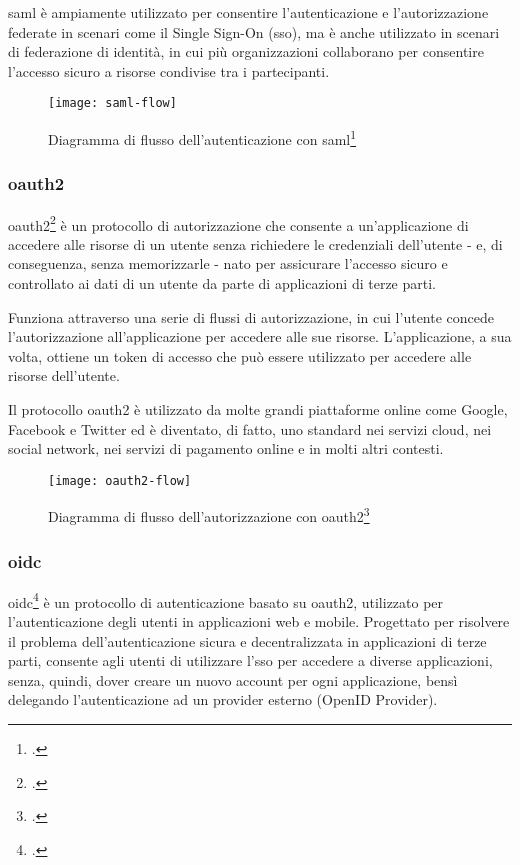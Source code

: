 \acrshort{saml} è ampiamente utilizzato per consentire l'autenticazione e l'autorizzazione federate in scenari come il Single Sign-On (\acrshort{sso}), ma è anche utilizzato in scenari di federazione di identità, in cui più organizzazioni collaborano per consentire l'accesso sicuro a risorse condivise tra i partecipanti.

\begin{figure}[!h] 
    \centering 
    \texttt{[image: saml-flow]} 
    \caption{Diagramma di flusso dell'autenticazione con \acrshort{saml}\footcite{site:saml-flow}}
\end{figure}

\subsubsection{\acrlong{oauth2}}
\acrshort{oauth2}\footcite{site:what-is-oauth} è un protocollo di autorizzazione che consente a un'applicazione di accedere alle risorse di un utente senza richiedere le credenziali dell'utente - e, di conseguenza, senza memorizzarle - nato per assicurare l'accesso sicuro e controllato ai dati di un utente da parte di applicazioni di terze parti.

Funziona attraverso una serie di flussi di autorizzazione, in cui l'utente concede l'autorizzazione all'applicazione per accedere alle sue risorse. L'applicazione, a sua volta, ottiene un token di accesso che può essere utilizzato per accedere alle risorse dell'utente.

Il protocollo \acrshort{oauth2} è utilizzato da molte grandi piattaforme online come Google, Facebook e Twitter ed è diventato, di fatto, uno standard nei servizi cloud, nei social network, nei servizi di pagamento online e in molti altri contesti.

\begin{figure}[!h] 
    \centering 
    \texttt{[image: oauth2-flow]} 
    \caption{Diagramma di flusso dell'autorizzazione con \acrshort{oauth2}\footcite{site:oauth-flow-img}}
\end{figure}
\subsubsection{\acrlong{oidc}}
\acrshort{oidc}\footcite{site:oidc} è un protocollo di autenticazione basato su \acrshort{oauth2}, utilizzato per l'autenticazione degli utenti in applicazioni web e mobile. Progettato per risolvere il problema dell'autenticazione sicura e decentralizzata in applicazioni di terze parti, consente agli utenti di utilizzare l'\acrshort{sso} per accedere a diverse applicazioni, senza, quindi, dover creare un nuovo account per ogni applicazione, bensì delegando l'autenticazione ad un provider esterno (OpenID Provider).


